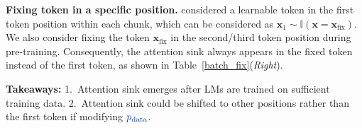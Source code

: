 \textbf{Fixing token in a specific position.} \citet{xiao2023efficient} considered a learnable token in the first token position within each chunk, which can be considered as $\boldsymbol{x}_1\sim \mathbb{I}(\boldsymbol{x}=\boldsymbol{x}_{\textrm{fix}})$. We also consider fixing the token $\boldsymbol{x}_{\textrm{fix}}$ in the second/third token position during pre-training. Consequently, the attention sink always appears in the fixed token instead of the first token, as shown in Table~\ref{batch_fix}(\emph{Right}).

\vspace{-0.1cm}
\begin{abox} %
     \textbf{Takeaways:} 1.~Attention sink emerges after LMs are trained on sufficient training data. 2.~Attention sink could be shifted to other positions rather than the first token if modifying $\color{cc2} p_{\textrm{data}}$.%
\end{abox}







